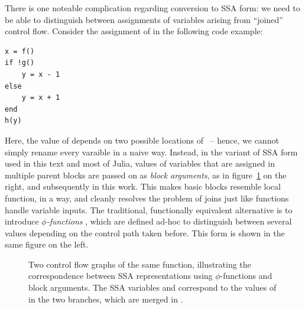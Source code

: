 There is one noteable complication regarding conversion to SSA form: we need to be able to
distinguish between assignments of variables arising from \enquote{joined} control flow.  Consider
the assignment of  in the following code example:
\begin{lstlisting}
x = f()
if !g()
    y = x - 1
else
    y = x + 1
end
h(y)
\end{lstlisting}
Here, the value of  depends on two possible locations of ~-- hence, we cannot
simply rename every varaible in a naive way.  Instead, in the variant of SSA form used in this text
and most of Julia, values of variables that are assigned in multiple parent blocks are passed on as
\emph{block arguments}, as in figure~\ref{fig:ssa-phi} on the right, and subsequently in this work.
This makes basic blocks resemble local function, in a way, and cleanly resolves the problem of joins
just like functions handle variable inputs.  The traditional, functionally equivalent alternative is
to introduce \emph{\(\phi\)-functions} \parencite{rosen1988global}, which are defined ad-hoc to
distinguish between several values depending on the control path taken before.  This form is shown
in the same figure on the left.

\begin{figure}[t]
  \centering
  \hfill
  \hfill
  \hfill\null
  \caption{Two control flow graphs of the same function, illustrating the correspondence between SSA
    representations using \(\phi\)-functions and block arguments.  The SSA variables
    \protect{} and \protect{} correspond to the values of \protect{} in the
    two branches, which are merged in \protect{}.}
  \label{fig:ssa-phi}
\end{figure}

